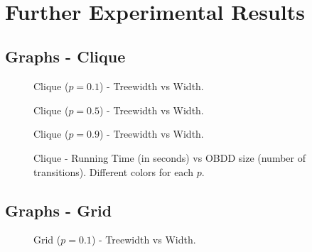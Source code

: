 $ $
$ $
\newpage

\section{Further Experimental Results}


\subsection{Graphs - Clique}

\begin{figure}[H]
    \begin{center}
        \resizebox{3.4in}{!}{}
    \end{center}
    \caption{Clique ($p=0.1$) - Treewidth vs Width.}
\end{figure}

\begin{figure}[H]
    \begin{center}
        \resizebox{3.4in}{!}{}
    \end{center}
    \caption{Clique ($p=0.5$) - Treewidth vs Width.}
\end{figure}

\begin{figure}[H]
    \begin{center}
        \resizebox{3.4in}{!}{}
    \end{center}
    \caption{Clique ($p=0.9$) - Treewidth vs Width.}
\end{figure}

\begin{figure}[H]
    \begin{center}
        \resizebox{3.4in}{!}{}
    \end{center}
    \caption{Clique - Running Time (in seconds) vs OBDD size (number of transitions). Different colors for each $p$.}
\end{figure}

\subsection{Graphs - Grid}

\begin{figure}[H]
    \begin{center}
        \resizebox{3.4in}{!}{}
    \end{center}
    \caption{Grid ($p=0.1$) - Treewidth vs Width.}
\end{figure}

